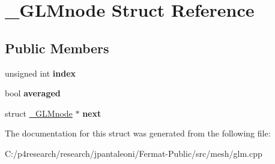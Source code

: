 \hypertarget{struct___g_l_mnode}{}\section{\+\_\+\+G\+L\+Mnode Struct Reference}
\label{struct___g_l_mnode}
\subsection*{Public Members}
\begin{DoxyCompactItemize}
\item 
\mbox{\label{struct___g_l_mnode_a63f773eb8316c34aab9a4afea99da96e}} 
unsigned int {\bfseries index}
\item 
\mbox{\label{struct___g_l_mnode_ad1f9f188fbbcd845d817ff9be51fbbb1}} 
bool {\bfseries averaged}
\item 
\mbox{\label{struct___g_l_mnode_a425191d3e6f9827ebd213b5f289990ae}} 
struct \hyperlink{struct___g_l_mnode}{\+\_\+\+G\+L\+Mnode} $\ast$ {\bfseries next}
\end{DoxyCompactItemize}


The documentation for this struct was generated from the following file\+:\begin{DoxyCompactItemize}
\item 
C\+:/p4research/research/jpantaleoni/\+Fermat-\/\+Public/src/mesh/glm.\+cpp\end{DoxyCompactItemize}
